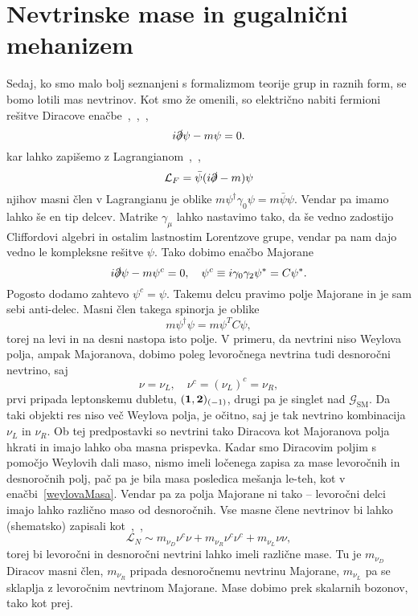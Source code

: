 \chapter{Nevtrinske mase in gugalnični mehanizem}

Sedaj, ko smo malo bolj seznanjeni s formalizmom teorije grup in raznih form, se bomo lotili mas nevtrinov.
Kot smo že omenili, so električno nabiti fermioni rešitve Diracove
enačbe~\cite{ryder},~\cite{palash},~\cite{quang},
\begin{equation}
	i\slashed{\partial} \psi - m\psi = 0.
\end{equation}
kar lahko zapišemo z Lagrangianom~\cite{palash},~\cite{quang},~\cite{ryder}
\begin{equation}
	\mathcal{L}_F = \bar{\psi}(i\slashed{\partial} - m)\psi
\end{equation}
njihov masni člen v Lagrangianu
je oblike $m\psi^\dagger\gamma_0\psi = m\bar{\psi}\psi$. Vendar pa imamo lahko še en tip delcev. Matrike
$\gamma_\mu$ lahko nastavimo tako, da še vedno zadostijo Cliffordovi algebri in ostalim lastnostim
Lorentzove grupe, vendar pa nam dajo vedno le kompleksne rešitve $\psi$. Tako dobimo enačbo Majorane
\begin{equation}
	i\slashed{\partial}\psi - m\psi^c = 0, \quad \psi^c \equiv i\gamma_0\gamma_2\psi^* = C\psi^*.
\end{equation}
Pogosto dodamo zahtevo $\psi^c = \psi$. Takemu delcu pravimo polje Majorane in je sam sebi anti-delec.
Masni člen takega spinorja je oblike
\begin{equation}
	m\psi^\dagger \psi = m\psi^T C\psi,
\end{equation}
torej na levi in na desni nastopa isto polje. V primeru, da nevtrini niso Weylova polja, ampak Majoranova,
dobimo poleg levoročnega nevtrina tudi desnoročni nevtrino, saj
\begin{equation}
	\nu = \nu_L, \quad \nu^c = (\nu_L)^c = \nu_R,
\end{equation}
prvi pripada leptonskemu dubletu, $(\mathbf{1}, \mathbf{2})_{(-1)}$, drugi pa je singlet nad $\mathcal{G}_\text{SM}$.
Da taki objekti res niso več Weylova polja, je očitno, saj je tak nevtrino kombinacija $\nu_L$ in $\nu_R$.
Ob tej predpostavki so nevtrini tako Diracova kot Majoranova polja hkrati in imajo lahko oba masna prispevka.
Kadar smo Diracovim poljim s pomočjo Weylovih dali maso, nismo imeli ločenega zapisa za mase levoročnih
in desnoročnih polj, pač pa je bila masa posledica mešanja le-teh, kot v enačbi~\eqref{weylovaMasa}.
Vendar pa za polja Majorane ni tako -- levoročni delci imajo lahko različno maso od desnoročnih.
Vse masne člene nevtrinov bi lahko (shematsko) zapisali kot~\cite{strumia},~\cite{miha},~\cite{nugut}
\begin{equation}
	\mathcal{L}_N \sim m_{\nu_D} \nu^c \nu + m_{\nu_R} \nu^c\nu^c + m_{\nu_L} \nu\nu,
\end{equation}
torej bi levoročni in desnoročni nevtrini lahko imeli različne mase. Tu je $m_{\nu_D}$ Diracov masni
člen, $m_{\nu_R}$ pripada desnoročnemu nevtrinu Majorane, $m_{\nu_L}$ pa se sklaplja z levoročnim
nevtrinom Majorane. Mase dobimo prek skalarnih bozonov, tako kot prej.

